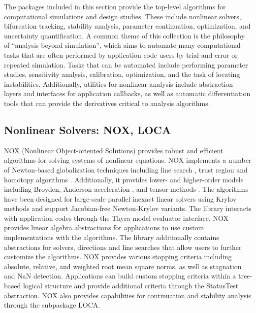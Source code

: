 
The packages included in this section provide the top-level algorithms for computational simulations and design studies.
These include nonlinear solvers, bifurcation tracking, stability analysis, parameter continuation, optimization, and uncertainty quantification.
A common theme of this collection is the philosophy of ``analysis beyond simulation'', which aims to automate many computational tasks that are often performed by application code users by trial-and-error or repeated simulation. Tasks that can be automated include performing parameter studies, sensitivity analysis, calibration, optimization, and the task of locating instabilities.
Additionally, utilities for nonlinear analysis include abstraction layers and interfaces for application callbacks, as well as automatic differentiation tools that can provide the derivatives critical to analysis algorithms.

\subsection{Nonlinear Solvers: NOX, LOCA} \label{sec:nox}
NOX (Nonlinear Object-oriented Solutions) provides robust and efficient algorithms for solving systems of nonlinear equations.
NOX implements a number of Newton-based globalization techniques including line search \cite{Pawlowski2006}, trust region \cite{Pawlowski2006,Pawlowski2008} and homotopy algorithms \cite{Coffey2003}.
Additionally, it provides lower- and higher-order models including Broyden, Anderson acceleration \cite{Walker2011}, and tensor methods \cite{Bader2005}.
The algorithms have been designed for large-scale parallel inexact linear solvers using Krylov methods and support Jacobian-free Newton-Krylov variants.
The library interacts with application codes through the Thyra model evaluator interface.
NOX provides linear algebra abstractions for applications to use custom implementations with the algorithms.
The library additionally contains abstractions for solvers, directions and line searches that allow users to further customize the algorithms.
NOX provides various stopping criteria including absolute, relative, and weighted root mean square norms, as well as stagnation and NaN detection.
Applications can build custom stopping criteria within a tree-based logical structure and provide additional criteria through the StatusTest abstraction.
NOX also provides capabilities for continuation and stability analysis through the subpackage LOCA.

